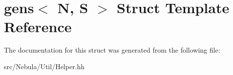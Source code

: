 \hypertarget{structgens}{\section{gens$<$ N, S $>$ Struct Template Reference}
\label{structgens}
}


The documentation for this struct was generated from the following file\-:\begin{DoxyCompactItemize}
\item 
src/\-Nebula/\-Util/Helper.\-hh\end{DoxyCompactItemize}
